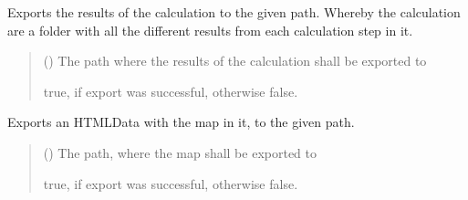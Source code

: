 \documentclass[letterpaper,10pt,english]{sphinxmanual}
\begin{document}
\begin{fulllineitems}
\begin{fulllineitems}
\label{\detokenize{apidoc/src.osm_configurator.model.application:src.osm_configurator.model.application.application_interface.IApplication.export_calculation}}
\pysigstartsignatures
{}
\pysigstopsignatures
\sphinxAtStartPar
Exports the results of the calculation to the given path.
Whereby the calculation are a folder with all the different results from each
calculation step in it.
\begin{quote}\begin{description}
\sphinxAtStartPar
{} () \textendash{} The path where the results of the calculation shall be exported to

\sphinxAtStartPar
true, if export was successful, otherwise false.

\sphinxAtStartPar
{}

\end{description}\end{quote}

\end{fulllineitems}


\begin{fulllineitems}
\label{\detokenize{apidoc/src.osm_configurator.model.application:src.osm_configurator.model.application.application_interface.IApplication.export_map}}
\pysigstartsignatures
{}
\pysigstopsignatures
\sphinxAtStartPar
Exports an HTML\sphinxhyphen{}Data with the map in it, to the given path.
\begin{quote}\begin{description}
\sphinxAtStartPar
{} () \textendash{} The path, where the map shall be exported to

\sphinxAtStartPar
true, if export was successful, otherwise false.

\sphinxAtStartPar
{}

\end{description}\end{quote}

\end{fulllineitems}


\end{fulllineitems}
\end{document}

